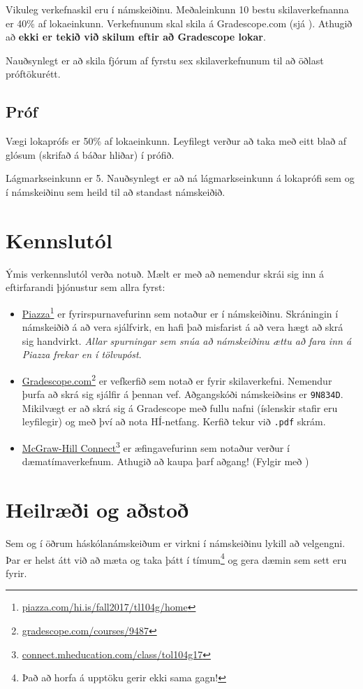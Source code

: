 \documentclass[justified, nobib]{tufte-handout}
\begin{document}
\begin{marginfigure}
\end{marginfigure}
Vikuleg verkefnaskil eru í námskeiðinu. Meðaleinkunn 10 bestu skilaverkefnanna er 40\% af lokaeinkunn. Verkefnunum skal skila á Gradescope.com (sjá ). Athugið að \textbf{ekki er tekið við skilum eftir að Gradescope lokar}.

Nauðsynlegt er að skila fjórum af fyrstu sex skilaverkefnunum til að öðlast próftökurétt.
\subsection{Próf}
Vægi lokaprófs er 50\% af lokaeinkunn. Leyfilegt verður að taka með eitt blað af glósum (skrifað á báðar hliðar) í prófið.

Lágmarkseinkunn er 5. Nauðsynlegt er að ná lágmarkseinkunn á lokaprófi sem og í námskeiðinu sem heild til að standast námskeiðið.
\section{Kennslutól}
\label{sec:tools}
Ýmis verkennslutól verða notuð. Mælt er með að nemendur skrái sig inn á eftirfarandi þjónustur sem allra fyrst:
\begin{itemize}
 \item \href{piazza.com/hi.is/fall2017/tl104g/home}{Piazza}\footnote{\url{piazza.com/hi.is/fall2017/tl104g/home}} er fyrirspurnavefurinn sem notaður er í námskeiðinu. Skráningin í námskeiðið á að vera sjálfvirk, en hafi það misfarist á að vera hægt að skrá sig handvirkt. \emph{Allar spurningar sem snúa að námskeiðinu ættu að fara inn á Piazza frekar en í tölvupóst}.
 \item \href{https://gradescope.com/courses/9487}{Gradescope.com}\footnote{\url{gradescope.com/courses/9487}} er vefkerfið sem notað er fyrir skilaverkefni. Nemendur þurfa að skrá sig sjálfir á þennan vef. Aðgangskóði námskeiðsins er \texttt{9N834D}. Mikilvægt er að skrá sig á Gradescope með fullu nafni (íslenskir stafir eru leyfilegir) og með því að nota HÍ-netfang. Kerfið tekur við \texttt{.pdf} skrám.
 \item \href{http://connect.mheducation.com/class/tol104g17}{McGraw-Hill Connect}\footnote{\url{connect.mheducation.com/class/tol104g17}} er æfingavefurinn sem notaður verður í dæmatímaverkefnum. Athugið að kaupa þarf aðgang! (Fylgir með )
\end{itemize}

\section{Heilræði og aðstoð}
Sem og í öðrum háskólanámskeiðum er virkni í námskeiðinu lykill að velgengni. Þar er helst átt við að mæta og taka þátt í tímum\footnote{Það að horfa á upptöku gerir ekki sama gagn!} og gera dæmin sem sett eru fyrir.
\end{document}
